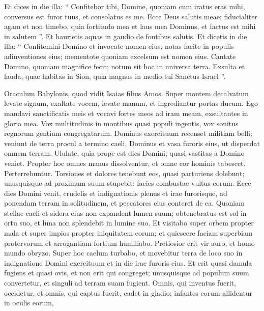 \begin{biblechapter}
\begin{biblechapter}
\begin{biblechapter}
\begin{biblechapter}
\begin{biblechapter}
\begin{biblechapter}
\begin{biblechapter}
\begin{biblechapter}
\begin{biblechapter}
\begin{biblechapter}
\begin{biblechapter}
\begin{biblechapter}
\verse Et dices in die illa:
 “ Confitebor tibi, Domine,
 quoniam cum iratus eras mihi,
 conversus est furor tuus, et consolatus es me.
 \verse Ecce Deus salutis meae;
 fiducialiter agam et non timebo,
 quia fortitudo mea et laus mea Dominus,
 et factus est mihi in salutem ”.
 \verse Et haurietis aquas in gaudio de fontibus salutis.
 \verse Et dicetis in die illa:
 “ Confitemini Domino et invocate nomen eius,
 notas facite in populis adinventiones eius;
 mementote quoniam excelsum est nomen eius.
 \verse Cantate Domino, quoniam magnifice fecit;
 notum sit hoc in universa terra.
 \verse Exsulta et lauda, quae habitas in Sion,
 quia magnus in medio tui Sanctus Israel ”.
 
\begin{biblechapter}
\verse Oraculum Babylonis, quod vidit Isaias filius Amos.
 \verse Super montem decalvatum levate signum,
 exaltate vocem, levate manum,
 et ingrediantur portas ducum.
 \verse Ego mandavi sanctificatis meis
 et vocavi fortes meos ad iram meam,
 exsultantes in gloria mea.
 \verse Vox multitudinis in montibus quasi populi ingentis,
 vox sonitus regnorum gentium congregatarum.
 Dominus exercituum recenset militiam belli;
 \verse veniunt de terra procul a termino caeli,
 Dominus et vasa furoris eius,
 ut disperdat omnem terram.
 \verse Ululate, quia prope est dies Domini;
 quasi vastitas a Domino veniet.
 \verse Propter hoc omnes manus dissolventur,
 et omne cor hominis tabescet.
 \verse Perterrebuntur.
 Torsiones et dolores tenebunt eos,
 quasi parturiens dolebunt;
 unusquisque ad proximum suum stupebit:
 facies combustae vultus eorum.
 \verse Ecce dies Domini venit,
 crudelis et indignationis plenus
 et irae furorisque,
 ad ponendam terram in solitudinem,
 et peccatores eius conteret de ea.
 \verse Quoniam stellae caeli et sidera eius
 non expandent lumen suum;
 obtenebratus est sol in ortu suo,
 et luna non splendebit in lumine suo.
 \verse Et visitabo super orbem propter mala
 et super impios propter iniquitatem eorum;
 et quiescere faciam superbiam protervorum
 et arrogantiam fortium humiliabo. 
\verse Pretiosior erit vir auro,
 et homo mundo obryzo.
 \verse Super hoc caelum turbabo,
 et movebitur terra de loco suo
 in indignatione Domini exercituum
 et in die irae furoris eius.
 \verse Et erit quasi damula fugiens et quasi ovis,
 et non erit qui congreget;
 unusquisque ad populum suum convertetur,
 et singuli ad terram suam fugient.
 \verse Omnis, qui inventus fuerit, occidetur,
 et omnis, qui captus fuerit, cadet in gladio;
 \verse infantes eorum allidentur in oculis eorum,

\end{biblechapter}
\end{biblechapter}
\end{biblechapter}
\end{biblechapter}
\end{biblechapter}
\end{biblechapter}
\end{biblechapter}
\end{biblechapter}
\end{biblechapter}
\end{biblechapter}
\end{biblechapter}
\end{biblechapter}
\end{biblechapter}
